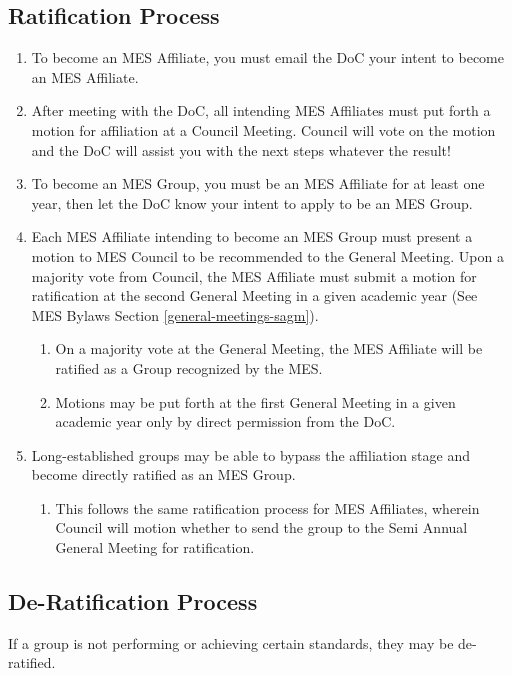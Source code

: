 \subsection{Ratification Process}
\label{ratification-process}
\begin{enumerate}
 \item
  To become an MES Affiliate, you must email the DoC your intent to become an MES Affiliate.
 \item
  After meeting with the DoC, all intending MES Affiliates must put forth a motion for affiliation at a Council Meeting. Council will vote on the motion and the DoC will assist you with the next steps whatever the result!
 \item
  To become an MES Group, you must be an MES Affiliate for at least one year, then let the DoC know your intent to apply to be an MES Group.
 \item
  Each MES Affiliate intending to become an MES Group must present a motion to MES Council to be recommended to the General Meeting. Upon a majority vote from Council, the MES Affiliate must submit a motion for ratification at the second General Meeting in a given academic year (See MES Bylaws Section \ref{general-meetings-sagm}).

  \begin{enumerate}
   \item
    On a majority vote at the General Meeting, the MES Affiliate will be ratified as a Group recognized by the MES.
   \item
    Motions may be put forth at the first General Meeting in a given academic year only by direct permission from the DoC.
  \end{enumerate}
 \item
  Long-established groups may be able to bypass the affiliation stage and become directly ratified as an MES Group.

  \begin{enumerate}
   \item
    This follows the same ratification process for MES Affiliates, wherein Council will motion whether to send the group to the Semi Annual General Meeting for ratification.
  \end{enumerate}

\end{enumerate}

\subsection{De-Ratification Process}
\label{de-ratification-process}
If a group is not performing or achieving certain standards, they may be
de-ratified.

